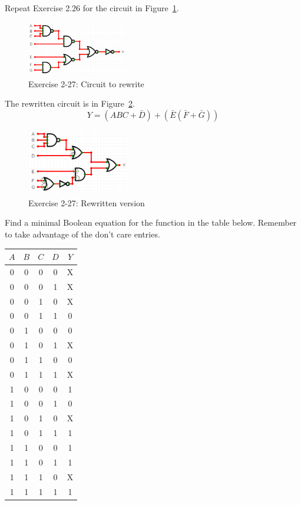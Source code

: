 \documentclass[12pt]{article}
\newenvironment{ex}[2][Exercise]{\begin{trivlist}
		\item[\hskip \labelsep {\bfseries #1}\hskip \labelsep {\bfseries #2.}]}{\end{trivlist}}
\newenvironment{sol}[1][Solution]{\begin{trivlist}
		\item[\hskip \labelsep {\bfseries #1:}]}{\end{trivlist}}
\begin{document}
\begin{ex}{2.27}
	Repeat Exercise 2.26 for the circuit in Figure~\ref{02-27-circuit-original}.
	\begin{figure}
		\centering
		\includegraphics[width=0.4\textwidth]{02-27-circuit-original}
		\caption{Exercise 2-27: Circuit to rewrite}
		\label{02-27-circuit-original}
	\end{figure}
\end{ex}

\begin{sol}
	The rewritten circuit is in Figure~\ref{02-27-circuit-rewritten}.
	\[
	Y=(ABC+\bar{D})+(\bar{E}(\bar{F}+\bar{G}))
	\]
	\begin{figure}
		\centering
		\includegraphics[width=0.4\textwidth]{02-27-circuit-rewritten}
		\caption{Exercise 2-27: Rewritten version}
		\label{02-27-circuit-rewritten}
	\end{figure}
\end{sol}

\begin{ex}{2.28}
	Find a minimal Boolean equation for the function in the table below.
	Remember to take advantage of the  don't care entries.
	\begin{center}
		\begin{tabular}{cccc|c}
			$A$ & $B$ & $C$ & $D$ & $Y$\\
			\hline
			0 & 0 & 0 & 0 & X\\
			0 & 0 & 0 & 1 & X\\
			0 & 0 & 1 & 0 & X\\
			0 & 0 & 1 & 1 & 0\\
			0 & 1 & 0 & 0 & 0\\
			0 & 1 & 0 & 1 & X\\
			0 & 1 & 1 & 0 & 0\\
			0 & 1 & 1 & 1 & X\\
			1 & 0 & 0 & 0 & 1\\
			1 & 0 & 0 & 1 & 0\\
			1 & 0 & 1 & 0 & X\\
			1 & 0 & 1 & 1 & 1\\
			1 & 1 & 0 & 0 & 1\\
			1 & 1 & 0 & 1 & 1\\
			1 & 1 & 1 & 0 & X\\
			1 & 1 & 1 & 1 & 1\\
		\end{tabular}
	\end{center}
\end{ex}
\end{document}
